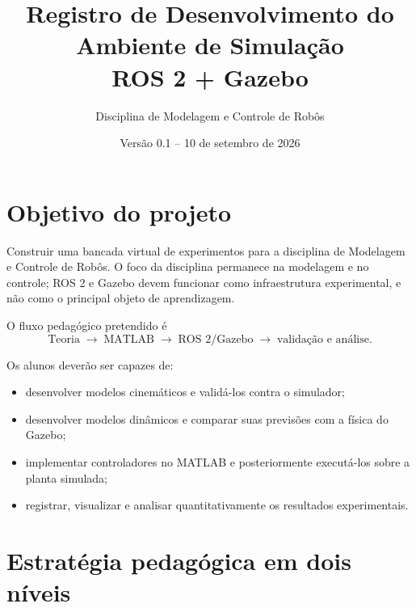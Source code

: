 \documentclass[11pt,a4paper]{article}
\title{\textbf{Registro de Desenvolvimento do Ambiente de Simulação\\ROS 2 + Gazebo}}
\author{Disciplina de Modelagem e Controle de Robôs}
\date{Versão 0.1 -- 10 de setembro de 2026}
\begin{document}
\maketitle

\begin{center}
\end{center}

\tableofcontents
\newpage

\section{Objetivo do projeto}

Construir uma bancada virtual de experimentos para a disciplina de Modelagem e Controle de Robôs. O foco da disciplina permanece na modelagem e no controle; ROS 2 e Gazebo devem funcionar como infraestrutura experimental, e não como o principal objeto de aprendizagem.

O fluxo pedagógico pretendido é
\begin{equation}
\boxed{\text{Teoria}}\;\longrightarrow\;\boxed{\text{MATLAB}}\;\longrightarrow\;\boxed{\text{ROS 2/Gazebo}}\;\longrightarrow\;\boxed{\text{validação e análise}}.
\end{equation}

Os alunos deverão ser capazes de:
\begin{itemize}
  \item desenvolver modelos cinemáticos e validá-los contra o simulador;
  \item desenvolver modelos dinâmicos e comparar suas previsões com a física do Gazebo;
  \item implementar controladores no MATLAB e posteriormente executá-los sobre a planta simulada;
  \item registrar, visualizar e analisar quantitativamente os resultados experimentais.
\end{itemize}

\section{Estratégia pedagógica em dois níveis}
\end{document}
